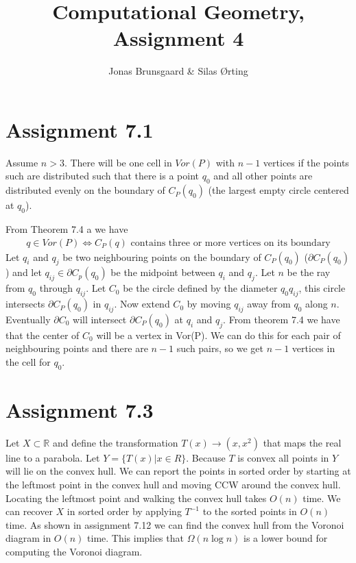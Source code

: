 \documentclass[10pt,a4paper,final,oneside,openany,article,oldfontcommands]{memoir}
\title{Computational Geometry, Assignment 4}
\author{
    Jonas Brunsgaard \& Silas Ørting
}
\begin{document}
\maketitle


\chapter*{Assignment 7.1}
Assume $n > 3$. There will be one cell in $Vor(P)$ with $n-1$ vertices if the points such are distributed such that there is a point $q_0$ and all other points are distributed evenly on the boundary of $C_P(q_0)$ (the largest empty circle centered at $q_0$).

From Theorem 7.4 a we have
\begin{align*}
  q \in Vor(P) \iff C_P(q) \text{ contains three or more vertices on its boundary}
\end{align*}
Let $q_i$ and $q_j$ be two neighbouring points on the boundary of $C_P(q_0)$ ($\partial C_P(q_0)$) and let $q_{ij} \in \partial C_p(q_0)$ be the midpoint between $q_i$ and $q_j$. Let $n$ be the ray from $q_0$ through $q_{ij}$. Let $C_0$ be the circle defined by the diameter $q_0q_{ij}$, this circle intersects $\partial C_P(q_0)$ in $q_{ij}$. Now extend $C_0$ by moving $q_{ij}$ away from $q_0$ along $n$. Eventually $\partial C_0$ will intersect $\partial C_P(q_0)$ at $q_i$ and $q_j$. From theorem 7.4 we have that the center of $C_0$ will be a vertex in Vor(P). We can do this for each pair of neighbouring points and there are $n-1$ such pairs, so we get $n-1$ vertices in the cell for $q_0$.

\chapter*{Assignment 7.3}
Let $X \subset \mathbb{R}$ and define the transformation $T(x) \to (x, x^2)$ that maps the real line to a parabola. Let $Y = \{T(x) | x \in R\}$. Because $T$ is convex all points in $Y$ will lie on the convex hull. We can report the points in sorted order by starting at the leftmost point in the convex hull and moving CCW around the convex hull. Locating the leftmost point and walking the convex hull takes $O(n)$ time. We can recover $X$ in sorted order by applying $T^{-1}$ to the sorted points in $O(n)$ time. As shown in assignment 7.12 we can find the convex hull from the Voronoi diagram in $O(n)$ time. This implies that $\Omega(n \log n)$ is a lower bound for computing the Voronoi diagram.
\end{document}
